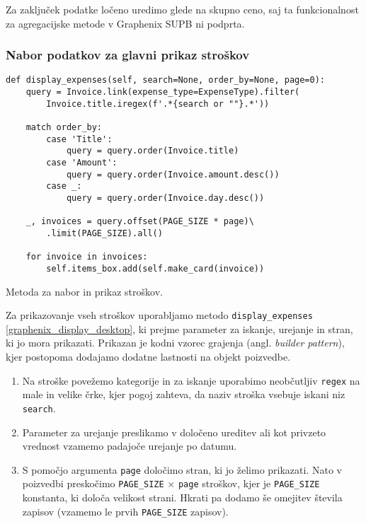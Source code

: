 \documentclass[a4paper,12pt,openright]{book}
\begin{document}
    Za zaključek podatke ločeno uredimo glede na skupno ceno, saj ta funkcionalnost za agregacijske metode v Graphenix SUPB ni podprta.

    \newpage
    \subsubsection{Nabor podatkov za glavni prikaz stroškov}

\begin{code}
\begin{verbatim}
def display_expenses(self, search=None, order_by=None, page=0):
    query = Invoice.link(expense_type=ExpenseType).filter(
        Invoice.title.iregex(f'.*{search or ""}.*'))

    match order_by:
        case 'Title':
            query = query.order(Invoice.title)
        case 'Amount':
            query = query.order(Invoice.amount.desc())
        case _:
            query = query.order(Invoice.day.desc())
    
    _, invoices = query.offset(PAGE_SIZE * page)\
        .limit(PAGE_SIZE).all()
    
    for invoice in invoices:
        self.items_box.add(self.make_card(invoice))
\end{verbatim}
\caption{Metoda za nabor in prikaz stroškov.}
\label{graphenix_display_desktop}
\end{code}

    \noindent
    Za prikazovanje vseh stroškov uporabljamo metodo {\tt display\_expenses} \ref{graphenix_display_desktop}, ki prejme parameter za iskanje, urejanje in stran, ki jo mora prikazati. Prikazan je kodni vzorec grajenja (angl. \textit{builder pattern}), kjer postopoma dodajamo dodatne lastnosti na objekt poizvedbe. 
    \begin{enumerate}
        \item Na stroške povežemo kategorije in za iskanje uporabimo neobčutljiv {\tt regex} na male in velike črke, kjer pogoj zahteva, da naziv stroška vsebuje iskani niz {\tt search}.
        \item Parameter za urejanje preslikamo v določeno ureditev ali kot privzeto vrednost vzamemo padajoče urejanje po datumu.
        \item S pomočjo argumenta {\tt page} določimo stran, ki jo želimo prikazati. Nato v poizvedbi preskočimo {\tt PAGE\_SIZE} $\times$ {\tt page} stroškov, kjer je {\tt PAGE\_SIZE} konstanta, ki določa velikost strani. Hkrati pa dodamo še omejitev števila zapisov (vzamemo le prvih {\tt PAGE\_SIZE} zapisov).
    \end{enumerate}
\end{document}
